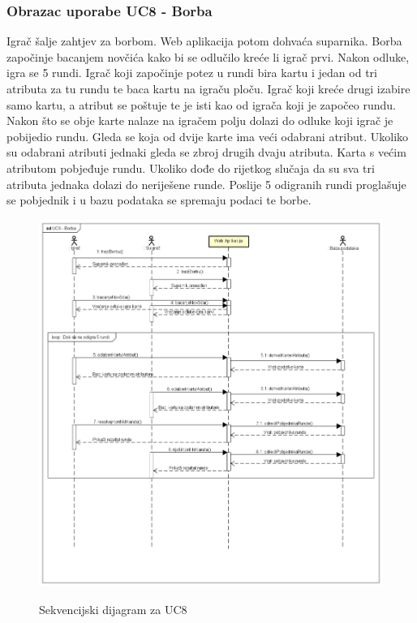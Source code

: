 				\subsubsection{Obrazac uporabe UC8 - Borba}
				\textnormal{Igrač šalje zahtjev za borbom. Web aplikacija potom dohvaća suparnika. Borba započinje bacanjem novčića kako bi se odlučilo kreće li igrač prvi. Nakon odluke, igra se 5 rundi. Igrač koji započinje potez u rundi bira kartu i jedan od tri atributa za tu rundu te baca kartu na igraču ploču. Igrač koji kreće drugi izabire samo kartu, a atribut se poštuje te je isti kao od igrača koji je započeo rundu. Nakon što se obje karte nalaze na igračem polju dolazi do odluke koji igrač je pobijedio rundu. Gleda se koja od dvije karte ima veći odabrani atribut. Ukoliko su odabrani atributi jednaki gleda se zbroj drugih dvaju atributa. Karta s većim atributom pobjeđuje rundu. Ukoliko dođe do rijetkog slučaja da su sva tri atributa jednaka dolazi do neriješene runde. Poslije 5 odigranih rundi proglašuje se pobjednik i u bazu podataka se spremaju podaci te borbe.}\\
				\begin{figure}[H]
					\centering
					\includegraphics[scale=0.52]{dijagrami/UC8 - Borba} \\
					\caption{Sekvencijski dijagram za UC8}
					\label{fig:UC8_sekvencijski}
				\end{figure}
			\eject
			
